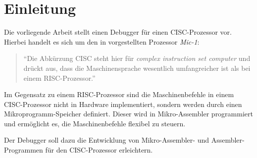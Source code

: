 \chapter*{Einleitung}
Die vorliegende Arbeit stellt einen Debugger für einen CISC-Prozessor vor. Hierbei handelt es sich um den in \cite{Stroetmann2007} vorgestellten Prozessor \emph{Mic-1}:
\begin{quotation}
``Die Abkürzung CISC steht hier für \emph{complex instruction set computer} und drückt aus, dass die Maschinensprache wesentlich umfangreicher ist als bei einem RISC-Prozessor.''
\end{quotation}

Im Gegensatz zu einem RISC-Prozessor sind die Maschinenbefehle in einem CISC-Prozessor nicht in Hardware implementiert, sondern werden durch einen Mikroprogramm-Speicher definiert. Dieser wird in Mikro-Assembler programmiert und ermöglicht es, die Maschinenbefehle flexibel zu steuern.

Der Debugger soll dazu die Entwicklung von Mikro-Assembler- und Assembler-Programmen für den CISC-Prozessor erleichtern.